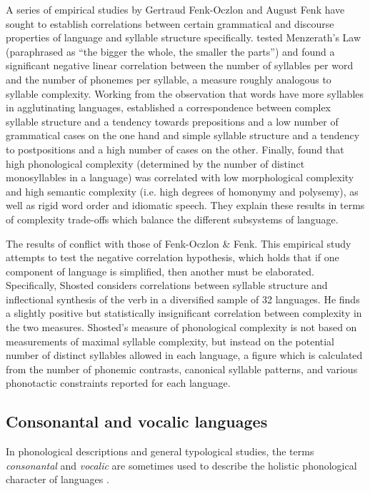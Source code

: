   A series of empirical studies by Gertraud Fenk-Oczlon and August Fenk have sought to establish correlations between certain grammatical and discourse properties of language and syllable structure specifically. \citet{FenkFenkOczlon1993} tested Menzerath’s Law (paraphrased as “the bigger the whole, the smaller the parts”) and found a significant negative linear correlation between the number of syllables per word and the number of phonemes per syllable, a measure roughly analogous to syllable complexity. Working from the observation that words have more syllables in agglutinating languages, \citet{FenkOczlonFenk2005} established a correspondence between complex syllable structure and a tendency towards prepositions and a low number of grammatical cases on the one hand and simple syllable structure and a tendency to postpositions and a high number of cases on the other. Finally, \citet{FenkOczlonFenk2008} found that high phonological complexity (determined by the number of distinct monosyllables in a language) was correlated with low morphological complexity and high semantic complexity (i.e. high degrees of homonymy and polysemy), as well as rigid word order and idiomatic speech. They explain these results in terms of complexity trade-offs which balance the different subsystems of language.

  The results of \citet{Shosted2006} conflict with those of Fenk-Oczlon \& Fenk. This empirical study attempts to test the negative correlation hypothesis, which holds that if one component of language is simplified, then another must be elaborated. Specifically, Shosted considers correlations between syllable structure and inflectional synthesis of the verb in a diversified sample of 32 languages. He finds a slightly positive but statistically insignificant correlation between complexity in the two measures. Shosted’s measure of phonological complexity is not based on measurements of maximal syllable complexity, but instead on the potential number of distinct syllables allowed in each language, a figure which is calculated from the number of phonemic contrasts, canonical syllable patterns, and various phonotactic constraints reported for each language.

\subsection{Consonantal and vocalic languages}\label{sec:1.3.3}

  In phonological descriptions and general typological studies, the terms \textit{consonantal} and \textit{vocalic} are sometimes used to describe the holistic phonological character of languages .

